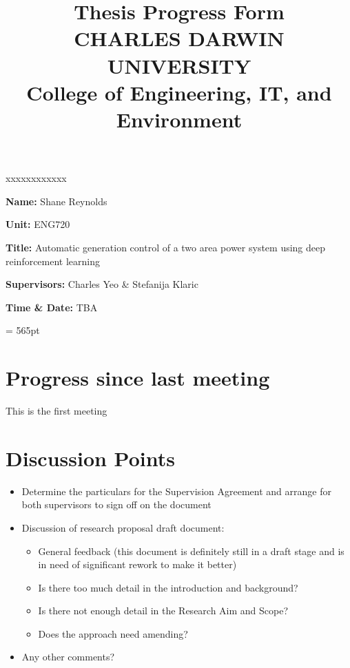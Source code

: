 \documentclass[12pt]{article}
\title{	
		Thesis Progress Form\\
		CHARLES DARWIN UNIVERSITY\\
		College of Engineering, IT, and Environment
	  }
\author{}
\date{}
\begin{document}
	
	\maketitle
	
	\begin{namelist}{xxxxxxxxxxxx}
		\item[{\bf Name:}]
			Shane Reynolds
		\item[{\bf Unit:}]
			ENG720
		\item[{\bf Title:}]
			Automatic generation control of a two area power system using deep reinforcement learning
		\item[{\bf Supervisors:}]
			Charles Yeo \& Stefanija Klaric
		\item[{\bf Time \& Date:}] TBA
			
	\end{namelist}
	
	\pagestyle{plain} %
	\textheight = 565pt %
	
	\section{Progress since last meeting}
	This is the first meeting
	
	\section{Discussion Points}
		\begin{itemize}
			\item Determine the particulars for the Supervision Agreement and arrange for both supervisors to sign off on the document
			
			\item Discussion of research proposal draft document:
			\begin{itemize}
				\item General feedback (this document is definitely still in a draft stage and is in need of significant rework to make it better)
				\item Is there too much detail in the introduction and background?
				\item Is there not enough detail in the Research Aim and Scope?
				\item Does the approach need amending?
			\end{itemize}
			
			\item Any other comments?
		
		\end{itemize}
	
\end{document}
